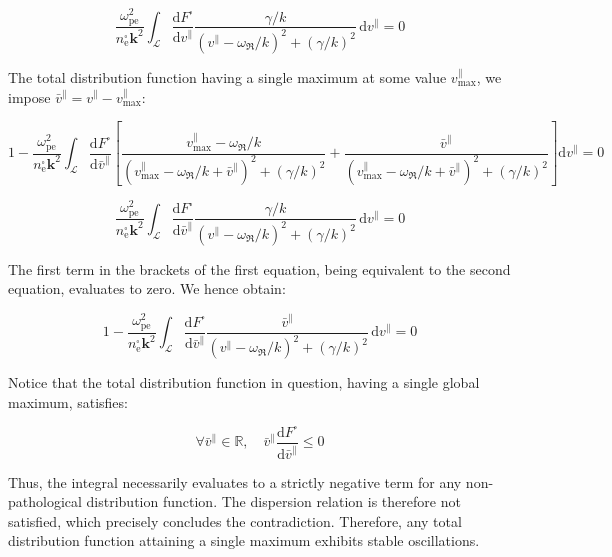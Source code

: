 \begin{equation}
    \frac{\omega_\text{pe}^2}{n_\text{e}^\square\mathbf{k}^2}\int_{\mathcal{L}}\frac{\mathrm{d}F^\square}{\mathrm{d}v^\parallel}\frac{\gamma/k}{\left(v^\parallel-\omega_{\Re}/k\right)^2+\left(\gamma/k\right)^2}\,\mathrm{d}v^\parallel=0
\end{equation}

The total distribution function having a single maximum at some value $v^\parallel_\text{max}$, we impose $\bar{v}^\parallel=v^\parallel-v^\parallel_\text{max}$:

\begin{equation}
    1-\frac{\omega_\text{pe}^2}{n_\text{e}^\square\mathbf{k}^2}\int_{\mathcal{L}}{\frac{\mathrm{d}F^\square}{\mathrm{d}\bar{v}^\parallel}}\left[\frac{v^\parallel_\text{max}-\omega_{\Re}/k}{\left(v^\parallel_\text{max}-\omega_{\Re}/k+\bar{v}^\parallel\right)^2+\left(\gamma/k\right)^2}+\frac{\bar{v}^\parallel}{\left(v^\parallel_\text{max}-\omega_{\Re}/k+\bar{v}^\parallel\right)^2+\left(\gamma/k\right)^2}\right]\mathrm{d}v^\parallel=0
\end{equation}

\begin{equation}
    \frac{\omega_\text{pe}^2}{n_\text{e}^\square\mathbf{k}^2}\int_{\mathcal{L}}\frac{\mathrm{d}F^\square}{\mathrm{d}\bar{v}^\parallel}\frac{\gamma/k}{\left(v^\parallel-\omega_{\Re}/k\right)^2+\left(\gamma/k\right)^2}\,\mathrm{d}v^\parallel=0
\end{equation}

The first term in the brackets of the first equation, being equivalent to the second equation, evaluates to zero. We hence obtain:

\begin{equation}
    1-\frac{\omega_\text{pe}^2}{n_\text{e}^\square\mathbf{k}^2}\int_{\mathcal{L}}\frac{\mathrm{d}F^\square}{\mathrm{d}\bar{v}^\parallel}\frac{\bar{v}^\parallel}{\left(v^\parallel-\omega_{\Re}/k\right)^2+\left(\gamma/k\right)^2}\,\mathrm{d}v^\parallel=0
\end{equation}

Notice that the total distribution function in question, having a single global maximum, satisfies:

\begin{equation}
    \forall\bar{v}^\parallel\in\mathbb{R},\quad\bar{v}^\parallel\frac{\mathrm{d}F^\square}{\mathrm{d}\bar{v}^\parallel}\leq0
\end{equation}

Thus, the integral necessarily evaluates to a strictly negative term for any non-pathological distribution function. The dispersion relation is therefore not satisfied, which precisely concludes the contradiction. Therefore, any total distribution function attaining a single maximum exhibits stable oscillations.

